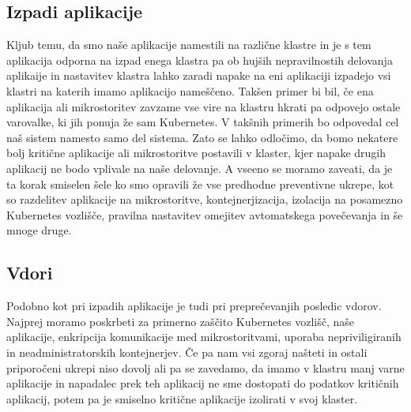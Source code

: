 \documentclass[a4paper, 12pt]{book}
\begin{document}
\subsection{Izpadi aplikacije}
Kljub temu, da smo naše aplikacije namestili na različne klastre in je s tem aplikacija odporna na izpad enega klastra pa ob hujših nepravilnostih delovanja aplikaije in nastavitev klastra lahko zaradi napake na eni aplikaciji izpadejo vsi klastri na katerih imamo aplikacijo nameščeno.
Takšen primer bi bil, če ena aplikacija ali mikrostoritev zavzame vse vire na klastru hkrati pa odpovejo ostale varovalke, ki jih ponuja že sam Kubernetes.
V takšnih primerih bo odpovedal cel naš sistem namesto samo del sistema.
Zato se lahko odločimo, da bomo nekatere bolj kritične aplikacije ali mikrostoritve postavili v klaster, kjer napake drugih aplikacij ne bodo vplivale na naše delovanje.
A vseeno se moramo zaveati, da je ta korak smiselen šele ko smo opravili že vse predhodne preventivne ukrepe, kot so razdelitev aplikacije na mikrostoritve, kontejnerjizacija, izolacija na posamezno Kubernetes vozlišče, pravilna nastavitev omejitev avtomatskega povečevanja in še mnoge druge.
\subsection{Vdori}
Podobno kot pri izpadih aplikacije je tudi pri preprečevanjih posledic vdorov.
Najprej moramo poskrbeti za primerno zaščito Kubernetes vozlišč, naše aplikacije, enkripcija komunikacije med mikrostoritvami, uporaba nepriviligiranih in neadministratorskih kontejnerjev.
  Če pa nam vsi zgoraj našteti in ostali priporočeni ukrepi niso dovolj ali pa se zavedamo, da imamo v klastru manj varne aplikacije in napadalec prek teh aplikacij ne sme dostopati do podatkov kritičnih aplikacij, potem pa je smiselno kritične aplikacije izolirati v svoj klaster.
\end{document}
